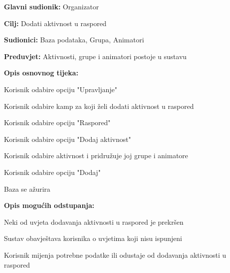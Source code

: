 					\noindent {}
					\begin{packed_item}
						
						\item \textbf{Glavni sudionik: } Organizator
						\item  \textbf{Cilj:} Dodati aktivnost u raspored
						\item  \textbf{Sudionici:} Baza podataka, Grupa, Animatori
						\item  \textbf{Preduvjet:} Aktivnosti, grupe i animatori postoje u sustavu
						\item  \textbf{Opis osnovnog tijeka:}
						
						\item[] \begin{packed_enum}
							
							\item Korisnik odabire opciju "Upravljanje"
							\item Korisnik odabire kamp za koji želi dodati aktivnost u raspored
							\item Korisnik odabire opciju "Raspored"
							\item Korisnik odabire opciju "Dodaj aktivnost"
							\item Korisnik odabire aktivnost i pridružuje joj grupe i animatore
							\item Korisnik odabire opciju "Dodaj"
							\item Baza se ažurira
						\end{packed_enum}
						
						\item  \textbf{Opis mogućih odstupanja:}
						
						\item[] \begin{packed_item}
							
							\item[5.a] Neki od uvjeta dodavanja aktivnosti u raspored je prekršen
							\item[] \begin{packed_enum}
								
								\item Sustav obavještava korisnika o uvjetima koji nisu ispunjeni
								\item Korisnik mijenja potrebne podatke ili odustaje od 
								dodavanja aktivnosti u raspored
								
							\end{packed_enum}			
						\end{packed_item}
					\end{packed_item}
				
